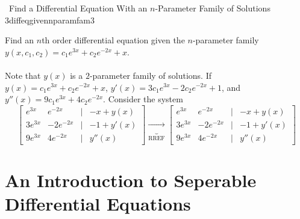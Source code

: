        \begin{example}{\Difficulty\,\Difficulty\,\,Find a Differential Equation With an \(n\)-Parameter Family of Solutions 3}{diffeqgivennparamfam3}
            
            Find an \(n\)th order differential equation given the \(n\)-parameter family \(y(x,c_1,c_2)=c_1e^{3x}+c_2e^{-2x}+x\).
            \\
            \\
            Note that \(y(x)\) is a \(2\)-parameter family of solutions. If \(y(x)=c_1e^{3x}+c_2e^{-2x}+x\), \(y'(x)=3c_1e^{3x}-2c_2e^{-2x}+1\), and \(y''(x)=9c_1e^{3x}+4c_2e^{-2x}\). Consider the system
            \begin{equation*}
                \begin{bmatrix}
                    e^{3x} & e^{-2x} & | & -x+y(x) \\
                    3e^{3x} & -2e^{-2x} & | & -1+y'(x) \\
                    9e^{3x} & 4e^{-2x} & | & y''(x)
                \end{bmatrix}\underbrace{\to}_{\text{RREF}}
                \begin{bmatrix}
                    e^{3x} & e^{-2x} & | & -x+y(x) \\
                    3e^{3x} & -2e^{-2x} & | & -1+y'(x) \\
                    9e^{3x} & 4e^{-2x} & | & y''(x)
                \end{bmatrix}
            \end{equation*}

        \end{example}

    \pagebreak

    \section{An Introduction to Seperable Differential Equations}

